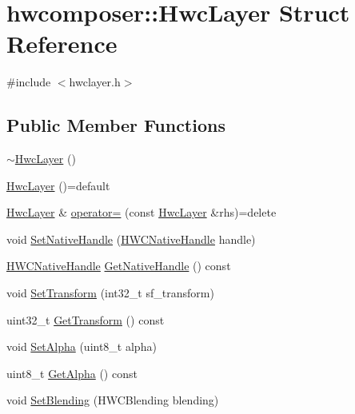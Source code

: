 \hypertarget{structhwcomposer_1_1HwcLayer}{}\section{hwcomposer\+:\+:Hwc\+Layer Struct Reference}
\label{structhwcomposer_1_1HwcLayer}


{\ttfamily \#include $<$hwclayer.\+h$>$}

\subsection*{Public Member Functions}
\begin{DoxyCompactItemize}
\item 
\mbox{\hyperlink{structhwcomposer_1_1HwcLayer_a209e2bfb04df70ba732ef94ca8f394aa}{$\sim$\+Hwc\+Layer}} ()
\item 
\mbox{\hyperlink{structhwcomposer_1_1HwcLayer_abaf8cc652a8f941398bdd54be6eeeba2}{Hwc\+Layer}} ()=default
\item 
\mbox{\hyperlink{structhwcomposer_1_1HwcLayer}{Hwc\+Layer}} \& \mbox{\hyperlink{structhwcomposer_1_1HwcLayer_a7aecfe497014881ef0dee984ee20a006}{operator=}} (const \mbox{\hyperlink{structhwcomposer_1_1HwcLayer}{Hwc\+Layer}} \&rhs)=delete
\item 
void \mbox{\hyperlink{structhwcomposer_1_1HwcLayer_aeaeb1f0fd1d4c5754e0946b43c6eef84}{Set\+Native\+Handle}} (\mbox{\hyperlink{alios_2platformdefines_8h_ac0a2eaf260f556d17fe489911f017bdf}{H\+W\+C\+Native\+Handle}} handle)
\item 
\mbox{\hyperlink{alios_2platformdefines_8h_ac0a2eaf260f556d17fe489911f017bdf}{H\+W\+C\+Native\+Handle}} \mbox{\hyperlink{structhwcomposer_1_1HwcLayer_a970873c68e816a7cfdbbe900262b8b44}{Get\+Native\+Handle}} () const
\item 
void \mbox{\hyperlink{structhwcomposer_1_1HwcLayer_ab30467eafc63b3b95059ff6ca3738933}{Set\+Transform}} (int32\+\_\+t sf\+\_\+transform)
\item 
uint32\+\_\+t \mbox{\hyperlink{structhwcomposer_1_1HwcLayer_a93f6c42bb261d8ce5899d7058948b1f7}{Get\+Transform}} () const
\item 
void \mbox{\hyperlink{structhwcomposer_1_1HwcLayer_a312a7530c7cdca364df62c950ccbd024}{Set\+Alpha}} (uint8\+\_\+t alpha)
\item 
uint8\+\_\+t \mbox{\hyperlink{structhwcomposer_1_1HwcLayer_a3108c9e303ad88d33782dd44d228e50e}{Get\+Alpha}} () const
\item 
void \mbox{\hyperlink{structhwcomposer_1_1HwcLayer_a7705d2ba4b36529f37dc0f7e706417eb}{Set\+Blending}} (H\+W\+C\+Blending blending)

\end{DoxyCompactItemize}
